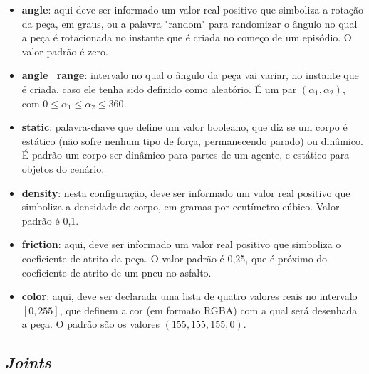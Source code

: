 \documentclass[cic,tc]{iiufrgs}
\begin{document}
\begin{itemize}
       \item \textbf{angle}: aqui deve ser informado um valor real positivo que simboliza a rotação da peça, em graus, ou a palavra "random" para randomizar o ângulo no qual a peça é rotacionada
       no instante que é criada no começo de um episódio. O valor padrão é zero.
       \item \textbf{angle\_range}: intervalo no qual o ângulo da peça vai variar, no instante que é criada, caso ele tenha sido definido como aleatório. É um par $(\alpha_1, \alpha_2)$, com
       $0 \leq \alpha_1 \leq \alpha_2 \leq 360$.
       \item \textbf{static}: palavra-chave que define um valor booleano, que diz se um corpo é estático (não sofre nenhum tipo de força, permanecendo parado) ou dinâmico. É padrão um corpo ser dinâmico para partes de um
       agente, e estático para objetos do cenário.
       \item \textbf{density}: nesta configuração, deve ser informado um valor real positivo que simboliza a densidade do corpo, em gramas por centímetro cúbico. Valor padrão é 0,1.
       \item \textbf{friction}: aqui, deve ser informado um valor real positivo que simboliza o coeficiente de atrito da peça. O valor padrão é 0,25, que é próximo do coeficiente de atrito de um pneu no asfalto.
       \item \textbf{color}: aqui, deve ser declarada uma lista de quatro valores reais no intervalo $[0,255]$, que definem a cor (em formato RGBA) com a qual será desenhada a peça. O padrão são os valores $(155, 155, 155, 0)$.
     \end{itemize}
    \subsection{\textit{Joints}}
    \label{joints}
    
\end{document}
